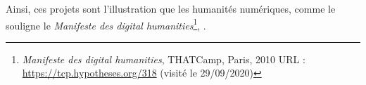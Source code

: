 Ainsi, ces projets sont l'illustration que les humanités numériques, comme le souligne le \emph{Manifeste des digital humanities}\footnote{\emph{Manifeste des digital humanities}, THATCamp, Paris, 2010 URL : \url{https://tcp.hypotheses.org/318} (visité le 29/09/2020)}, .